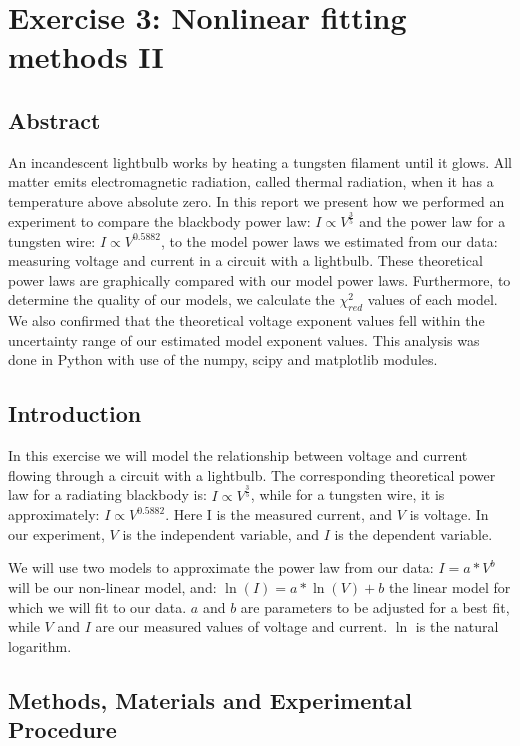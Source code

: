 \documentclass[letterpaper,12pt]{article}
\begin{document}
\pagebreak

\section{Exercise 3:  Nonlinear fitting methods II}

\subsection{Abstract}

An incandescent lightbulb works by heating a tungsten filament until it glows. 
All matter emits electromagnetic radiation, called thermal radiation, 
when it has a temperature above absolute zero. 
In this report we present how we performed an experiment to compare 
the blackbody power law: $I \propto V^{\frac{3}{5}}$ and the power law for a tungsten wire: 
$I \propto V^{0.5882}$, to the model power laws we estimated from our data: 
measuring voltage and current in a circuit with a lightbulb. 
These theoretical power laws are graphically compared with 
our model power laws. Furthermore, to determine the quality of our models, 
we calculate the $\chi^2_{red}$ values of each model. We also confirmed 
that the theoretical voltage exponent values fell within the uncertainty range 
of our estimated model exponent values. This analysis was done in Python with use 
of the numpy, scipy and matplotlib modules.

\subsection{Introduction}

In this exercise we will model the relationship between voltage and current flowing 
through a circuit with a lightbulb. The corresponding theoretical power law for a 
radiating blackbody is: $I \propto V^{\frac{3}{5}}$, while for a tungsten wire, it is approximately: 
$I \propto V^{0.5882}$. Here I is the measured current, and $V$ is voltage. In our experiment, 
$V$ is the independent variable, and $I$ is the dependent variable. 

We will use two models to approximate the power law from our data: $I = a*V^b$ 
will be our non-linear model, and: $\ln(I) = a*\ln(V)+b$ the linear model for which 
we will fit to our data. $a$ and $b$ are parameters to be adjusted for a best fit, 
while $V$ and $I$ are our measured values of voltage and current. $\ln$ is the natural logarithm.

\subsection{Methods, Materials and Experimental Procedure}
\end{document}
